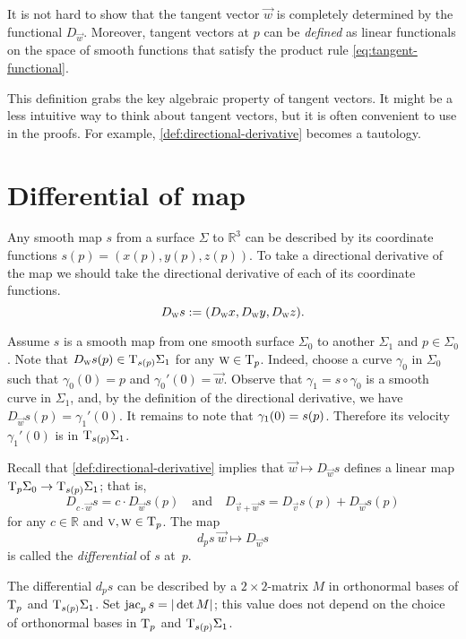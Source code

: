 It is not hard to show that the tangent vector $\vec w$ is completely determined by the functional $D_{\vec w}$.
Moreover, tangent vectors at $p$ can be \emph{defined} as linear functionals on the space of smooth functions
that satisfy the product rule \ref{eq:tangent-functional}.

This definition grabs the key algebraic property of tangent vectors.
It might be a less intuitive way to think about tangent vectors, but it is often convenient to use in the proofs. 
For example, \ref{def:directional-derivative} becomes a tautology.

\section{Differential of map}\label{sec:differential}

Any smooth map $s$ from a surface $\Sigma$ to $\mathbb{R}^3$ can be described by its coordinate functions 
$ s(p)=(x(p),y(p),z(p))$. 
To take a directional derivative of the map we should take the  directional derivative of each of its coordinate functions.
\[D_{\text{\sc{w}}} s\mathrel{:=}(D_{\text{\sc{w}}}x,D_{\text{\sc{w}}}y,D_{\text{\sc{w}}}z).\]

Assume $s$ is a smooth map from one smooth surface $\Sigma_0$ to another $\Sigma_1$ and $p\in \Sigma_0$.
Note that $D_{\text{\sc{w}}} s(p)\in \mathrm{T}_{s(p)}\Sigma_1$ for any $\text{\sc{w}}\in \mathrm{T}_p$.
Indeed, choose a curve $\gamma_0$ in $\Sigma_0$ such that $\gamma_0(0)=p$ and $\gamma_0'(0)=\vec w$.
Observe that $\gamma_1= s\circ \gamma_0$ is a smooth curve in $\Sigma_1$, and, 
by the definition of the directional derivative, we have $D_{\vec w} s(p)=\gamma_1'(0)$.
It remains to note that $\gamma_1(0)\z= s(p)$.
Therefore its velocity $\gamma_1'(0)$ is in $\mathrm{T}_{ s(p)}\Sigma_1$.

Recall that \ref{def:directional-derivative} implies that 
$\vec w \mapsto D_{\vec w} s$ defines a linear map $\T_p\Sigma_0\z\to \T_{ s(p)}\Sigma_1$;
that is,
\[D_{c\cdot \vec w} s=c\cdot D_{\vec w} s(p)
\quad\text{and}\quad D_{\vec v+ \vec w} s=D_{\vec v} s(p)+ D_{\vec w} s(p)\]
for any $c\in\mathbb{R}$ and $\text{\sc{v}}, \text{\sc{w}}\in\mathrm{T}_p$.
The map 
\[d_p s\:\vec w \mapsto D_{\vec w} s\] 
is called the \emph{differential} of $s$ at~$p$.

The differential $d_p s$ can be described by a $2{\times}2$-matrix $M$ in orthonormal bases of $\mathrm{T}_p$ and $\mathrm{T}_{s(p)}\Sigma_1$.
Set $\mathop{\rm jac}\nolimits_p s=|\det M|$; this value  
does not depend on the choice of orthonormal bases in $\mathrm{T}_p$ and $\mathrm{T}_{s(p)}\Sigma_1$. \label{page:|L|}

